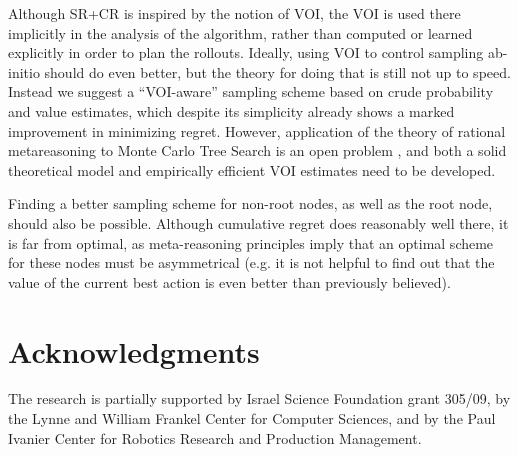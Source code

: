 \documentclass[letterpaper]{article}
\begin{document}
Although SR+CR is inspired  by the notion of VOI,
the VOI is used there implicitly in the analysis of the algorithm,
rather than computed or learned explicitly in order to plan the
rollouts. Ideally, using VOI to control sampling ab-initio should do even better,
but the theory for doing that is still not up to speed. Instead we suggest
a  ``VOI-aware'' sampling scheme based on crude probability and value estimates,
which despite its simplicity already shows a marked improvement in minimizing regret.
However, application of the theory of rational metareasoning
to Monte Carlo Tree Search is an open problem \cite{HayRussell.MCTS},
and both a solid theoretical model and empirically efficient VOI
estimates need to be developed. 

Finding a better sampling scheme for non-root nodes,
as well as the root node, should also be possible.
Although cumulative regret does reasonably
well there, it is far from optimal, as meta-reasoning principles imply that an optimal scheme
for these nodes must be asymmetrical (e.g. it is not helpful to find out that the
value of the current best action is even better than previously believed).

\section*{Acknowledgments}

The research is partially supported by Israel
Science Foundation grant 305/09, by the Lynne and William Frankel
Center for Computer Sciences, and by the Paul Ivanier Center for
Robotics Research and Production Management.



\end{document}
